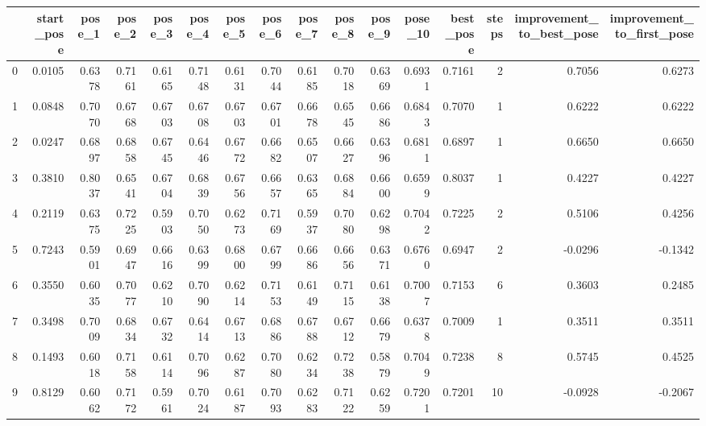\begin{tabular}{lrrrrrrrrrrrrrrr}
\toprule
{} &  start\_pose &  pose\_1 &  pose\_2 &  pose\_3 &  pose\_4 &  pose\_5 &  pose\_6 &  pose\_7 &  pose\_8 &  pose\_9 &  pose\_10 &  best\_pose &  steps &  improvement\_to\_best\_pose &  improvement\_to\_first\_pose \\
\midrule
0   &      0.0105 &  0.6378 &  0.7161 &  0.6165 &  0.7148 &  0.6131 &  0.7044 &  0.6185 &  0.7018 &  0.6369 &   0.6931 &     0.7161 &      2 &                    0.7056 &                     0.6273 \\
1   &      0.0848 &  0.7070 &  0.6768 &  0.6703 &  0.6708 &  0.6703 &  0.6701 &  0.6678 &  0.6545 &  0.6686 &   0.6843 &     0.7070 &      1 &                    0.6222 &                     0.6222 \\
2   &      0.0247 &  0.6897 &  0.6858 &  0.6745 &  0.6446 &  0.6772 &  0.6682 &  0.6507 &  0.6627 &  0.6396 &   0.6811 &     0.6897 &      1 &                    0.6650 &                     0.6650 \\
3   &      0.3810 &  0.8037 &  0.6541 &  0.6704 &  0.6839 &  0.6756 &  0.6657 &  0.6365 &  0.6884 &  0.6600 &   0.6599 &     0.8037 &      1 &                    0.4227 &                     0.4227 \\
4   &      0.2119 &  0.6375 &  0.7225 &  0.5903 &  0.7050 &  0.6273 &  0.7169 &  0.5937 &  0.7080 &  0.6298 &   0.7042 &     0.7225 &      2 &                    0.5106 &                     0.4256 \\
5   &      0.7243 &  0.5901 &  0.6947 &  0.6616 &  0.6399 &  0.6800 &  0.6799 &  0.6686 &  0.6656 &  0.6371 &   0.6760 &     0.6947 &      2 &                   -0.0296 &                    -0.1342 \\
6   &      0.3550 &  0.6035 &  0.7077 &  0.6210 &  0.7090 &  0.6214 &  0.7153 &  0.6149 &  0.7115 &  0.6138 &   0.7007 &     0.7153 &      6 &                    0.3603 &                     0.2485 \\
7   &      0.3498 &  0.7009 &  0.6834 &  0.6732 &  0.6414 &  0.6713 &  0.6886 &  0.6788 &  0.6712 &  0.6679 &   0.6378 &     0.7009 &      1 &                    0.3511 &                     0.3511 \\
8   &      0.1493 &  0.6018 &  0.7158 &  0.6114 &  0.7096 &  0.6287 &  0.7080 &  0.6234 &  0.7238 &  0.5879 &   0.7049 &     0.7238 &      8 &                    0.5745 &                     0.4525 \\
9   &      0.8129 &  0.6062 &  0.7172 &  0.5961 &  0.7024 &  0.6187 &  0.7093 &  0.6283 &  0.7122 &  0.6259 &   0.7201 &     0.7201 &     10 &                   -0.0928 &                    -0.2067 \\

\end{tabular}
